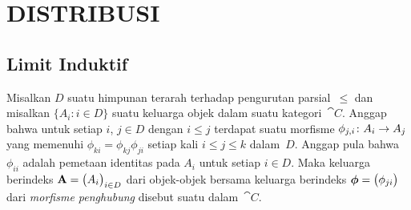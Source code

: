 \chapter{DISTRIBUSI}

\section{Limit Induktif}\label{sec_ind_limits}
\begin{defn}\label{defn_dir_sys} Misalkan $D$ suatu himpunan terarah terhadap pengurutan parsial~$\le$ dan misalkan $\{A_i\colon i \in D\}$ suatu keluarga
objek dalam suatu kategori~$\cat C$.  Anggap bahwa untuk setiap $i$, $j \in D$ dengan $i \le j$ terdapat suatu morfisme
$\phi_{j,i}\colon A_i \rightarrow A_j$ yang memenuhi $\phi_{ki} = \phi_{kj}\phi_{ji}$ setiap kali $i \le j \le k$ dalam~$D$.  Anggap pula bahwa
$\phi_{ii}$ adalah pemetaan identitas pada $A_i$ untuk setiap $i \in D$. Maka keluarga berindeks $\mathbf{A} = \bigl(A_i\bigr)_{i \in D}$ dari
objek-objek bersama keluarga berindeks $\boldsymbol{\phi} = \bigl(\phi_{ji}\bigr)$ dari \emph{morfisme penghubung} disebut suatu
 dalam~$\cat C$.
\end{defn}

